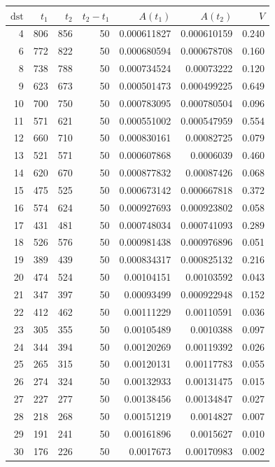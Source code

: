 \begin{tabular}{r r r r r r r}
\toprule
$\mathrm{dst}$ & $t_1$ & $t_2$ & $t_2-t_1$ & $A(t_1)$ & $A(t_2)$ & $V$ \\
\midrule
4 & 806 & 856 & 50 & 0.000611827 & 0.000610159 & 0.240 \\
6 & 772 & 822 & 50 & 0.000680594 & 0.000678708 & 0.160 \\
8 & 738 & 788 & 50 & 0.000734524 & 0.00073222 & 0.120 \\
9 & 623 & 673 & 50 & 0.000501473 & 0.000499225 & 0.649 \\
10 & 700 & 750 & 50 & 0.000783095 & 0.000780504 & 0.096 \\
11 & 571 & 621 & 50 & 0.000551002 & 0.000547959 & 0.554 \\
12 & 660 & 710 & 50 & 0.000830161 & 0.00082725 & 0.079 \\
13 & 521 & 571 & 50 & 0.000607868 & 0.0006039 & 0.460 \\
14 & 620 & 670 & 50 & 0.000877832 & 0.00087426 & 0.068 \\
15 & 475 & 525 & 50 & 0.000673142 & 0.000667818 & 0.372 \\
16 & 574 & 624 & 50 & 0.000927693 & 0.000923802 & 0.058 \\
17 & 431 & 481 & 50 & 0.000748034 & 0.000741093 & 0.289 \\
18 & 526 & 576 & 50 & 0.000981438 & 0.000976896 & 0.051 \\
19 & 389 & 439 & 50 & 0.000834317 & 0.000825132 & 0.216 \\
20 & 474 & 524 & 50 & 0.00104151 & 0.00103592 & 0.043 \\
21 & 347 & 397 & 50 & 0.00093499 & 0.000922948 & 0.152 \\
22 & 412 & 462 & 50 & 0.00111229 & 0.00110591 & 0.036 \\
23 & 305 & 355 & 50 & 0.00105489 & 0.0010388 & 0.097 \\
24 & 344 & 394 & 50 & 0.00120269 & 0.00119392 & 0.026 \\
25 & 265 & 315 & 50 & 0.00120131 & 0.00117783 & 0.055 \\
26 & 274 & 324 & 50 & 0.00132933 & 0.00131475 & 0.015 \\
27 & 227 & 277 & 50 & 0.00138456 & 0.00134847 & 0.027 \\
28 & 218 & 268 & 50 & 0.00151219 & 0.0014827 & 0.007 \\
29 & 191 & 241 & 50 & 0.00161896 & 0.0015627 & 0.010 \\
30 & 176 & 226 & 50 & 0.0017673 & 0.00170983 & 0.002 \\

\end{tabular}
